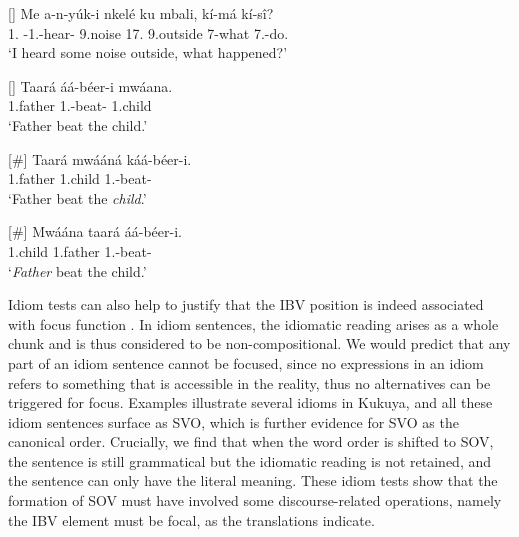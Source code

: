 \documentclass[output=paper,colorlinks,citecolor=brown,
]{langscibook}
\begin{document}
\begin{exe} 
    \ex \label{68}
    \begin{xlist}
\ex
[]{
\label{68a}
\gll
Me a-n-yúk-i nkelé ku mbali, kí-má kí-s\^{i}?\\
1\Sg{}.\Pro{} \Pst{}-1\Sg{}.\Sm{}-hear-\Fv{} 9.noise 17.\Loc{} 9.outside 7-what 7\Sm{}.\Pst{}-do.\Pst{}\\
\trans ‘I heard some noise outside, what happened?’
}

\ex
[]{
\label{68b}
\gll
Taará áá-béer-i mwáana.\\
1.father 1\Sm{}.\Pst{}-beat-\Pst{} 1.child\\
\trans ‘Father beat the child.’
}

\ex
[\#]{
\label{68c}
\gll
Taará mwááná káá-béer-i.\\
1.father 1.child 1\Sm{}.\Pst{}-beat-\Pst{}\\
\trans ‘Father beat the \textit{child}.’
}

\ex
[\#]{
\label{68d}
\gll
Mwáána taará áá-béer-i.\\
1.child 1.father 1\Sm{}.\Pst{}-beat-\Pst{}\\
\trans ‘\textit{Father} beat the child.’
}

    \end{xlist}
\end{exe}
Idiom tests can also help to justify that the IBV position is indeed associated with focus function \citep{vanderWal2016, vanderWal2021a}. In idiom sentences, the idiomatic reading arises as a whole chunk and is thus considered to be non-compositional. We would predict that any part of an idiom sentence cannot be focused, since no expressions in an idiom refers to something that is accessible in the reality, thus no alternatives can be triggered for focus. Examples  illustrate several idioms in Kukuya, and all these idiom sentences surface as SVO, which is further evidence for SVO as the canonical order. Crucially, we find that when the word order is shifted to SOV, the sentence is still grammatical but the idiomatic reading is not retained, and the sentence can only have the literal meaning. These idiom tests show that the formation of SOV must have involved some discourse-related operations, namely the IBV element must be focal, as the translations indicate.
\end{document}
